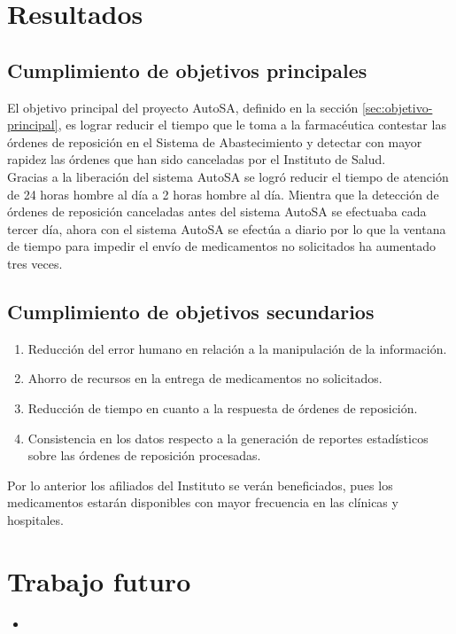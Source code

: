 \section{Resultados}

\subsection{Cumplimiento de objetivos principales}
El objetivo principal del proyecto AutoSA, definido en la sección \ref{sec:objetivo-principal}, es lograr reducir el tiempo que le toma a la farmacéutica contestar las órdenes de reposición en el Sistema de Abastecimiento y detectar con mayor rapidez las órdenes que han sido canceladas por el Instituto de Salud.\\
Gracias a la liberación del sistema AutoSA se logró reducir el tiempo de atención de 24 horas hombre al día a 2 horas hombre al día. Mientra que la detección de órdenes de reposición canceladas antes del sistema AutoSA se efectuaba cada tercer día, ahora con el sistema AutoSA se efectúa a diario por lo que la ventana de tiempo para impedir el envío de medicamentos no solicitados ha aumentado tres veces.

\subsection{Cumplimiento de objetivos secundarios}

\begin{enumerate}
	\item Reducción del error humano en relación a la manipulación de la información.
	\item Ahorro de recursos en la entrega de medicamentos no solicitados.
	\item Reducción de tiempo en cuanto a la respuesta de órdenes de reposición.
	\item Consistencia en los datos respecto a la generación de reportes estadísticos sobre las órdenes de reposición procesadas.
\end{enumerate}
Por lo anterior los afiliados del Instituto se verán beneficiados, pues los medicamentos estarán disponibles con mayor frecuencia en las clínicas y hospitales.

\section{Trabajo futuro}
\begin{itemize}
	\item 
\end{itemize}

